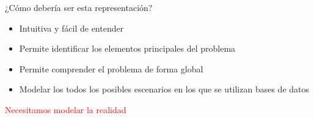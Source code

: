 \begin{frame}{¿C\'omo deber\'ia ser esta representaci\'on?}

    \begin{block}{}
        \begin{itemize}
            \item Intuitiva y f\'acil de entender
            \item Permite identificar los elementos principales del problema
            \item Permite comprender el problema de forma global
            \item Modelar los todos los posibles escenarios en los que se utilizan bases de datos
        \end{itemize}
        \vspace{5mm}
        \centering
        \textcolor{red}{\Large Necesitamos modelar la realidad}
    \end{block}

\end{frame}